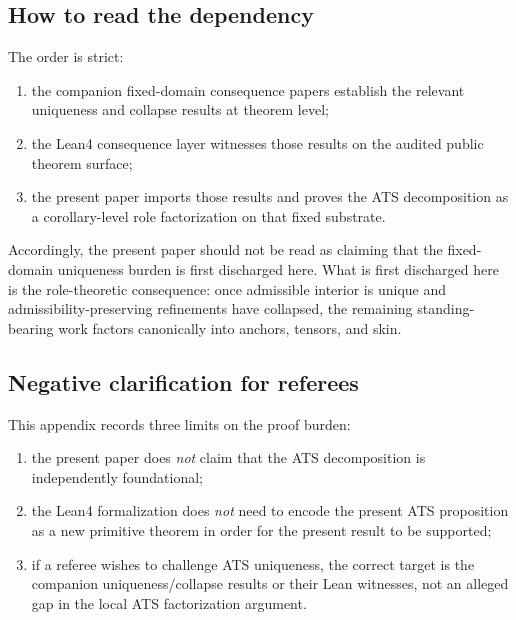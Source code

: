 \documentclass[12pt]{article}
\theoremstyle{plain}
\begin{document}
\subsection*{How to read the dependency}
The order is strict:
\begin{enumerate}[leftmargin=*]
    \item the companion fixed-domain consequence papers establish the relevant uniqueness and collapse results at theorem level;
    \item the Lean4 consequence layer witnesses those results on the audited public theorem surface;
    \item the present paper imports those results and proves the ATS decomposition as a corollary-level role factorization on that fixed substrate.
\end{enumerate}
Accordingly, the present paper should not be read as claiming that the fixed-domain uniqueness burden is first discharged here. What is first discharged here is the role-theoretic consequence: once admissible interior is unique and admissibility-preserving refinements have collapsed, the remaining standing-bearing work factors canonically into anchors, tensors, and skin.

\subsection*{Negative clarification for referees}
This appendix records three limits on the proof burden:
\begin{enumerate}[leftmargin=*]
    \item the present paper does \emph{not} claim that the ATS decomposition is independently foundational;
    \item the Lean4 formalization does \emph{not} need to encode the present ATS proposition as a new primitive theorem in order for the present result to be supported;
    \item if a referee wishes to challenge ATS uniqueness, the correct target is the companion uniqueness/collapse results or their Lean witnesses, not an alleged gap in the local ATS factorization argument.
\end{enumerate}
\end{document}
